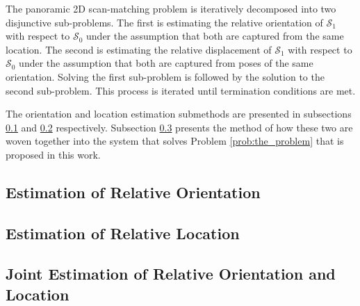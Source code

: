 The panoramic 2D scan-matching problem is iteratively decomposed into two
disjunctive sub-problems. The first is estimating the relative orientation of
$\mathcal{S}_1$ with respect to $\mathcal{S}_0$ under the assumption that both
are captured from the same location. The second is estimating the relative
displacement of $\mathcal{S}_1$ with respect to $\mathcal{S}_0$ under the
assumption that both are captured from poses of the same orientation. Solving
the first sub-problem is followed by the solution to the second sub-problem.
This process is iterated until termination conditions are met.

The orientation and location estimation submethods are presented in subsections
\ref{subsec:method_orientation_correction} and
\ref{subsec:method_location_correction} respectively. Subsection
\ref{subsec:method_pose_correction} presents the method of how these two
are woven together into the system that solves Problem \ref{prob:the_problem}
that is proposed in this work.

\subsection{Estimation of Relative Orientation}
  \label{subsec:method_orientation_correction}
  

\subsection{Estimation of Relative Location}
  \label{subsec:method_location_correction}
  

\subsection{Joint Estimation of Relative Orientation and Location}
  \label{subsec:method_pose_correction}
  
